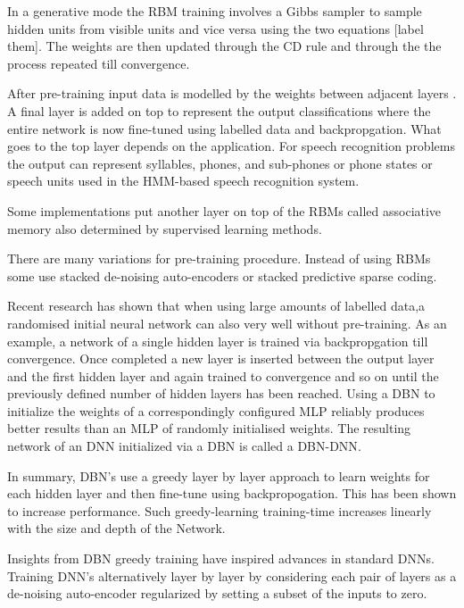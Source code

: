 In a generative mode the RBM training involves  a Gibbs sampler to sample hidden units from visible units and vice versa using the two equations [label them]\citep{mo2012survey}.
The weights are then updated through the CD rule and through the the process repeated till convergence.

After pre-training input data is modelled by the weights between adjacent layers \citep{chen2014big}.
A final layer is added on top to represent the output classifications where the entire network is now fine-tuned using labelled data and backpropgation.
What goes to the top layer depends on the application.
For speech recognition problems the output can represent syllables, phones, and sub-phones or phone states or speech units used in the HMM-based speech recognition system\citep{dengthree}.


Some implementations put another layer on top of the RBMs called associative memory also determined by supervised learning methods\citep{chen2014big}.


There are many variations for pre-training procedure.
Instead of using RBMs some use stacked de-noising auto-encoders or stacked predictive sparse coding\citep{chen2014big}.

Recent research has shown that when using large amounts of labelled data,a randomised initial neural network can also 
very well without pre-training.
As an example, a network of a single hidden layer is trained via backpropgation till convergence.
Once completed a new layer is inserted between the output layer and the first hidden layer and again trained to convergence and so on until the previously defined number of hidden layers has been reached\citep{chen2014big}.
Using a DBN to initialize the weights of a correspondingly configured  MLP reliably produces better results than an MLP of randomly initialised weights.
The resulting network of an DNN initialized via a DBN is called a DBN-DNN\citep{dengthree}.

In summary, DBN's use a greedy layer by layer approach to learn weights for each hidden layer and then fine-tune using backpropogation.
This has been shown to increase performance\citep{chen2014big}\citep{jarrett2009best}.
Such greedy-learning training-time increases linearly with the size and depth of the Network\citep{dengthree}.

Insights from DBN greedy training have inspired advances in standard DNNs.
Training DNN's alternatively layer by layer by considering each pair of layers as a de-noising auto-encoder regularized by setting a subset of the inputs to zero.

